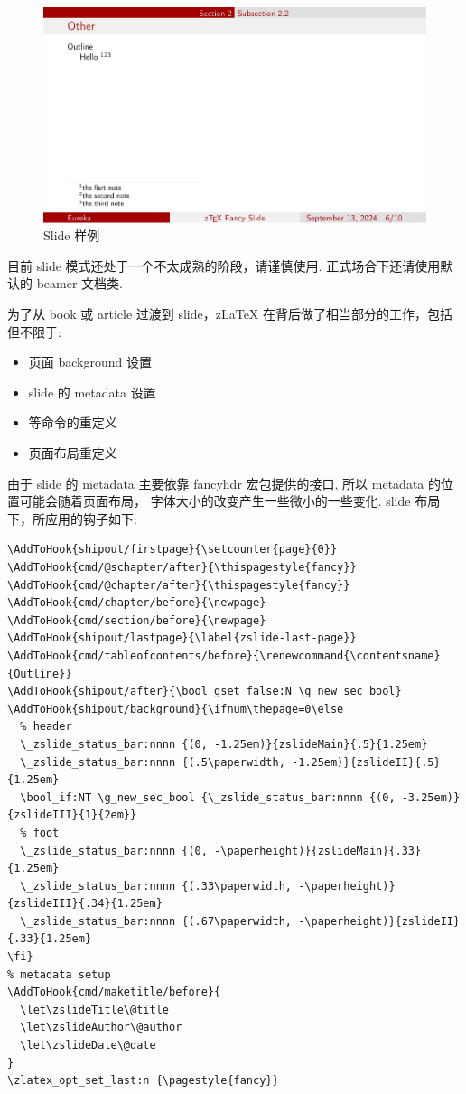 \begin{figure}[!htb]
  \includegraphics[width=.45\linewidth]{./pics/doc2slide_7.pdf}
  \caption{Slide 样例}
  \label{fig:slide-example}
\end{figure}

\begin{remark}
目前 slide 模式还处于一个不太成熟的阶段，请谨慎使用. 正式场合下还请使用默认的 beamer 文档类.
\end{remark}

为了从 book 或 article 过渡到 slide，z\LaTeX{} 在背后做了相当部分的工作，包括但不限于:
\begin{itemize}
  \item 页面 background 设置 
  \item slide 的 metadata 设置
  \item \cmd[F]{\chapter,\section}等命令的重定义
  \item 页面布局重定义
\end{itemize}

由于 slide 的 metadata 主要依靠 fancyhdr 宏包提供的接口, 所以 metadata 的位置可能会随着页面布局，
字体大小的改变产生一些微小的一些变化. slide 布局下，所应用的钩子如下:
\begin{verbatim}
\AddToHook{shipout/firstpage}{\setcounter{page}{0}}
\AddToHook{cmd/@schapter/after}{\thispagestyle{fancy}}
\AddToHook{cmd/@chapter/after}{\thispagestyle{fancy}}
\AddToHook{cmd/chapter/before}{\newpage}
\AddToHook{cmd/section/before}{\newpage}
\AddToHook{shipout/lastpage}{\label{zslide-last-page}}
\AddToHook{cmd/tableofcontents/before}{\renewcommand{\contentsname}{Outline}}
\AddToHook{shipout/after}{\bool_gset_false:N \g_new_sec_bool}
\AddToHook{shipout/background}{\ifnum\thepage=0\else
  % header
  \_zslide_status_bar:nnnn {(0, -1.25em)}{zslideMain}{.5}{1.25em}
  \_zslide_status_bar:nnnn {(.5\paperwidth, -1.25em)}{zslideII}{.5}{1.25em}
  \bool_if:NT \g_new_sec_bool {\_zslide_status_bar:nnnn {(0, -3.25em)}{zslideIII}{1}{2em}}
  % foot
  \_zslide_status_bar:nnnn {(0, -\paperheight)}{zslideMain}{.33}{1.25em}
  \_zslide_status_bar:nnnn {(.33\paperwidth, -\paperheight)}{zslideIII}{.34}{1.25em}
  \_zslide_status_bar:nnnn {(.67\paperwidth, -\paperheight)}{zslideII}{.33}{1.25em}
\fi}
% metadata setup
\AddToHook{cmd/maketitle/before}{
  \let\zslideTitle\@title
  \let\zslideAuthor\@author
  \let\zslideDate\@date
}
\zlatex_opt_set_last:n {\pagestyle{fancy}}
\end{verbatim}

